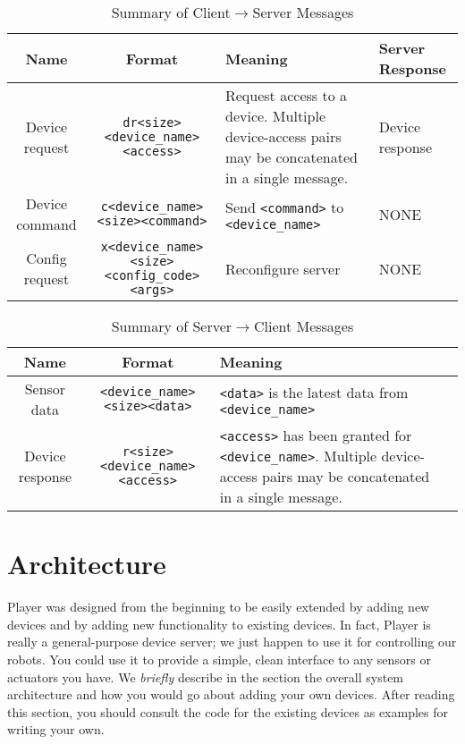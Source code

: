 \documentclass[11pt]{article}
\begin{document}
\begin{table}[h]
\begin{center}
{\small
\begin{tabularx}{\columnwidth}{|c|c|X|X|}
\hline
Name & Format & Meaning & Server Response\\
\hline
Device request & {\tt dr<size><device\_name><access>} & Request access to a device.
Multiple device-access pairs may be concatenated in a single message.
& Device response \\
\hline
Device command & {\tt c<device\_name><size><command>} & 
Send {\tt <command>} to {\tt <device\_name>} & NONE \\
\hline
Config request & {\tt x<device\_name><size><config\_code><args>} & 
Reconfigure server & NONE \\
\hline
\end{tabularx}
}
\end{center}
\caption{Summary of Client$\rightarrow$Server Messages}
\label{summary_cs}
\end{table}

\begin{table}[h]
\begin{center}
{\small
\begin{tabularx}{\columnwidth}{|c|c|X|X|}
\hline
Name & Format & Meaning \\
\hline
Sensor data & {\tt <device\_name><size><data>} & 
{\tt <data>} is the latest data from {\tt <device\_name>}\\
\hline
Device response & {\tt r<size><device\_name><access>} & 
{\tt <access>} has been granted for {\tt <device\_name>}.
Multiple device-access pairs may be concatenated in a single message.\\
\hline
\end{tabularx}
}
\end{center}
\caption{Summary of Server$\rightarrow$Client Messages}
\label{summary_sc}
\end{table}



\newpage
\section{Architecture}
\label{architecture}
Player was designed from the beginning to be easily extended by adding
new devices and by adding new functionality to existing devices.  In fact,
Player is really a general-purpose device server; we just happen to use
it for controlling our robots.  You could use it to provide a simple, clean
interface to any sensors or actuators you have.
We {\sl briefly} describe in the section the overall system architecture and how
you would go about adding your own devices.  After reading this section,
you should consult the code for the existing devices as examples for
writing your own.
\end{document}
